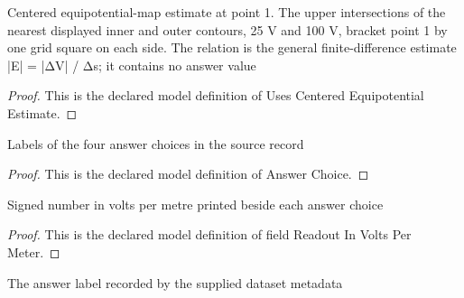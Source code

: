 \begin{definition}
  \label{def:physics:phyx-mini-0876:phyxminiproblems-problemphyxmini0876-usescenteredequipotentialestimate}
  Centered equipotential-map estimate at point 1. The upper intersections of the nearest displayed inner and outer contours, 25 V and 100 V, bracket point 1 by one grid square on each side. The relation is the general finite-difference estimate |E| = |ΔV| / Δs; it contains no answer value
\end{definition}
\begin{proof}
  This is the declared model definition of Uses Centered Equipotential Estimate.
\end{proof}
\begin{definition}
  \label{def:physics:phyx-mini-0876:phyxminiproblems-problemphyxmini0876-answerchoice}
  Labels of the four answer choices in the source record
\end{definition}
\begin{proof}
  This is the declared model definition of Answer Choice.
\end{proof}
\begin{definition}
  \label{def:physics:phyx-mini-0876:phyxminiproblems-problemphyxmini0876-answerchoice-fieldreadoutinvoltspermeter}
  Signed number in volts per metre printed beside each answer choice
\end{definition}
\begin{proof}
  This is the declared model definition of field Readout In Volts Per Meter.
\end{proof}
\begin{definition}
  \label{def:physics:phyx-mini-0876:phyxminiproblems-problemphyxmini0876-recordeddatasetanswer}
  The answer label recorded by the supplied dataset metadata
\end{definition}
